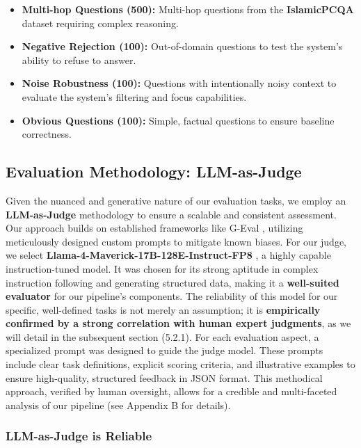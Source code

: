 \documentclass[11pt]{article}
\begin{document}
\begin{itemize}
    \item \textbf{Multi-hop Questions (500):} Multi-hop questions from the \textbf{IslamicPCQA} dataset requiring complex reasoning.
    \item \textbf{Negative Rejection (100):} Out-of-domain questions to test the system's ability to refuse to answer.
    \item \textbf{Noise Robustness (100):} Questions with intentionally noisy context to evaluate the system's filtering and focus capabilities.
    \item \textbf{Obvious Questions (100):} Simple, factual questions to ensure baseline correctness.
\end{itemize}

\subsection{Evaluation Methodology: LLM-as-Judge}

Given the nuanced and generative nature of our evaluation tasks, we employ an \textbf{LLM-as-Judge} methodology \cite{zheng2023judging} to ensure a scalable and consistent assessment. Our approach builds on established frameworks like G-Eval \cite{liu2023geval}, utilizing meticulously designed custom prompts to mitigate known biases. For our judge, we select \textbf{Llama-4-Maverick-17B-128E-Instruct-FP8} \cite{meta2025llama4}, a highly capable instruction-tuned model. It was chosen for its strong aptitude in complex instruction following and generating structured data, making it a \textbf{well-suited evaluator} for our pipeline's components. The reliability of this model for our specific, well-defined tasks is not merely an assumption; it is \textbf{empirically confirmed by a strong correlation with human expert judgments}, as we will detail in the subsequent section (5.2.1). For each evaluation aspect, a specialized prompt was designed to guide the judge model. These prompts include clear task definitions, explicit scoring criteria, and illustrative examples to ensure high-quality, structured feedback in JSON format. This methodical approach, verified by human oversight, allows for a credible and multi-faceted analysis of our pipeline (see Appendix B for details).

\subsubsection{LLM-as-Judge is Reliable}
\end{document}
